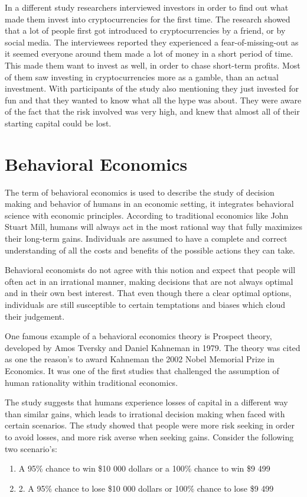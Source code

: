 In a different study researchers interviewed investors in order to find out what made them invest into cryptocurrencies for the first time. The research showed that a lot of people first got introduced to cryptocurrencies by a friend, or by social media. The interviewees reported they experienced a fear-of-missing-out as it seemed everyone around them made a lot of money in a short period of time. This made them want to invest as well, in order to chase short-term profits. Most of them saw investing in cryptocurrencies more as a gamble, than an actual investment. With participants of the study also mentioning they just invested for fun and that they wanted to know what all the hype was about. They were aware of the fact that the risk involved was very high, and knew that almost all of their starting capital could be lost.\autocite{Magnusson2022} \bigbreak

\section{Behavioral Economics} \bigbreak

The term of behavioral economics is used to describe the study of decision making and behavior of humans in an economic setting, it integrates behavioral science with economic principles. According to traditional economics like John Stuart Mill, humans will always act in the most rational way that fully maximizes their long-term gains. Individuals are assumed to have a complete and correct understanding of all the costs and benefits of the possible actions they can take.\autocite{Reed2013} \bigbreak

Behavioral economists do not agree with this notion and expect that people will often act in an irrational manner, making decisions that are not always optimal and in their own best interest. That even though there a clear optimal options, individuals are still susceptible to certain temptations and biases which cloud their judgement.\autocite{Reed2013} \bigbreak

One famous example of a behavioral economics theory is Prospect theory, developed by Amos Tversky and Daniel Kahneman in 1979. The theory was cited as one the reason’s to award Kahneman the 2002 Nobel Memorial Prize in Economics. It was one of the first studies that challenged the  assumption of human rationality within traditional economics.\autocite{Kahneman1979} \bigbreak

The study suggests that humans experience losses of capital in a different way than similar gains, which leads to irrational decision making when faced with certain scenarios. The study showed that people were more risk seeking in order to avoid losses, and more risk averse when seeking gains.\autocite{Kahneman1979} Consider the following two scenario’s:
\begin{enumerate}
    \item A 95\% chance to win \$10 000 dollars or a 100\% chance to win \$9 499
    \item 2.	A 95\% chance to lose \$10 000 dollars or 100\% chance to lose \$9 499  
\end{enumerate} \bigbreak

